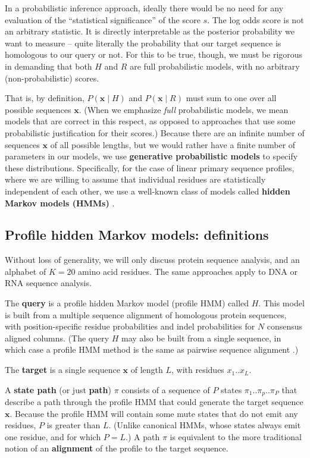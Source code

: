 \documentclass[11pt]{article}
\begin{document}
In a probabilistic inference approach, ideally there would be no need
for any evaluation of the ``statistical significance'' of the score
$s$.  The log odds score is not an arbitrary statistic. It is directly
interpretable as the posterior probability we want to measure -- quite
literally the probability that our target sequence is homologous to
our query or not. For this to be true, though, we must be rigorous in
demanding that both $H$ and $R$ are full probabilistic models, with no
arbitrary (non-probabilistic) scores.

That is, by definition, $P(\mathbf{x} \mid H)$ and $P(\mathbf{x} \mid
R)$ must sum to one over all possible sequences $\mathbf{x}$.  (When
we emphasize \emph{full} probabilistic models, we mean models that are
correct in this respect, as opposed to approaches that use some
probabilistic justification for their scores.)  Because there are an
infinite number of sequences $\mathbf{x}$ of all possible lengths, but
we would rather have a finite number of parameters in our models, we
use \textbf{generative probabilistic models} to specify these
distributions. Specifically, for the case of linear primary sequence
profiles, where we are willing to assume that individual residues are
statistically independent of each other, we use a well-known class of
models called \textbf{hidden Markov models (HMMs)} \citep{Durbin98}.


\subsection{Profile hidden Markov models: definitions}

Without loss of generality, we will only discuss protein sequence
analysis, and an alphabet of $K=20$ amino acid residues. The same
approaches apply to DNA or RNA sequence analysis.

The \textbf{query} is a profile hidden Markov model (profile HMM)
called $H$. This model is built from a multiple sequence alignment of
homologous protein sequences, with position-specific residue
probabilities and indel probabilities for $N$ consensus aligned
columns. (The query $H$ may also be built from a single sequence, in
which case a profile HMM method is the same as pairwise sequence
alignment \citep{HolmesBruno01}.)

The \textbf{target} is a single sequence $\mathbf{x}$ of length $L$,
with residues $x_1..x_L$. 

A \textbf{state path} (or just \textbf{path}) $\pi$ consists of a
sequence of $P$ states $\pi_1..\pi_p..\pi_P$ that describe a path
through the profile HMM that could generate the target sequence
$\mathbf{x}$. Because the profile HMM will contain some mute states
that do not emit any residues, $P$ is greater than $L$. (Unlike
canonical HMMs, whose states always emit one residue, and for which
$P=L$.) A path $\pi$ is equivalent to the more traditional notion of
an \textbf{alignment} of the profile to the target sequence.  
\end{document}
